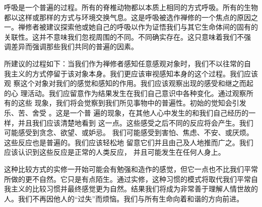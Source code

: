 呼吸是一个普遍的过程。所有的脊椎动物都以本质上相同的方式呼吸。所有的生物
都以这样或那样的方式与环境交换气息。这是呼吸被选作禅修的一个焦点的原因之
一。禅修者被建议探索他或她自己的呼吸以作为证悟我们与其它生命体间的固有的
关联性。这\1并不意味我们忽视周围的不同。不同确实存在。这只意味着我们不强
调差异而强调那些我们共同的普遍的因素。

所建议的过程如下：当我们作为禅修者感知任意感观对象时，我们不以往常的自
我主义的方式停留于该对象本身。我们更应该审视感知本身的这个过程。我们应该观
察这个对象对我们的感觉和感知的作用。我们应该观察出现的感受和继之而起的心
理活动。我们应留意作为结果发生在我们自己意识中各种变化。通过观察所有的这些
现象，我们将会觉察到我们所见事物中的普遍性。初始的觉知会引发乐、苦、舍受%
。这是一个普
遍的现象，在其他人心中发生的和我们自己经历的一样，并且我们应该清楚地看到
这一点。这些感受之后不同的反应将会产生。我们可能感受到贪念、欲望、或妒忌。
我们可能感受到害怕、焦虑、不安、或厌烦。这些反应也是普遍的。我们应该轻松地
留意它们并且由己及人地推而广之。我们应该认识到这些反应是正常的人类反应，
并且可能发生在任何人身上。

这种比较方式的实修一开始可能会有勉强和造作的感觉，但它一点也不比我们平常
所做的更不自然。它只是有点陌生。通过实修，这种习惯的模式将取代我们平常自
我主义的比较习惯并最终感觉更为自然。结果我们将成为非常善于理解人情世故的
人。我们不再因他人的“过失”而烦恼。我们与所有生命向着和谐的方向前进。

\endchapter

\byebye
